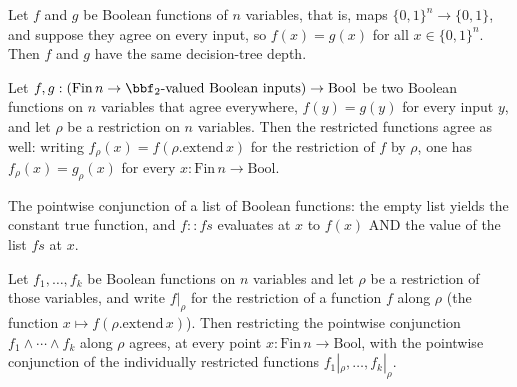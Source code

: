\begin{lemma}
\label{LMN.dtDepth_congr}
\leanok
{}
Let $f$ and $g$ be Boolean functions of $n$ variables, that is, maps $\{0,1\}^n \to
\{0,1\}$, and suppose they agree on every input, so $f(x) = g(x)$ for all $x \in
\{0,1\}^n$. Then $f$ and $g$ have the same decision-tree depth.
\end{lemma}

\begin{lemma}
\label{LMN.restrictFn_congr}
\leanok
{}
Let $f, g : (\mathrm{Fin}\,n \to \bbf_2\text{-valued Boolean inputs}) \to \mathrm{Bool}$
be two Boolean functions on $n$ variables that agree everywhere, $f(y) = g(y)$ for every
input $y$, and let $\rho$ be a restriction on $n$ variables. Then the restricted
functions agree as well: writing $f_\rho(x) = f(\rho.\mathrm{extend}\,x)$ for the
restriction of $f$ by $\rho$, one has $f_\rho(x) = g_\rho(x)$ for every $x :
\mathrm{Fin}\,n \to \mathrm{Bool}$.
\end{lemma}

\begin{definition}
\label{LMN.listAnd}
\leanok
The pointwise conjunction of a list of Boolean functions: the empty list yields the
constant $\mathrm{true}$ function, and $f :: fs$ evaluates at $x$ to $f(x)$ AND the
value of the list $fs$ at $x$.
\end{definition}

\begin{lemma}
\label{LMN.restrictFn_listAnd}
\leanok
{}
Let $f_1, \dots, f_k$ be Boolean functions on $n$ variables and let $\rho$ be a
restriction of those variables, and write $f|_\rho$ for the restriction of a function
$f$ along $\rho$ (the function $x \mapsto f(\rho.\mathrm{extend}\,x)$). Then restricting
the pointwise conjunction $f_1 \wedge \cdots \wedge f_k$ along $\rho$ agrees, at every
point $x : \mathrm{Fin}\,n \to \mathrm{Bool}$, with the pointwise conjunction of the
individually restricted functions $f_1|_\rho, \dots, f_k|_\rho$.
\end{lemma}

